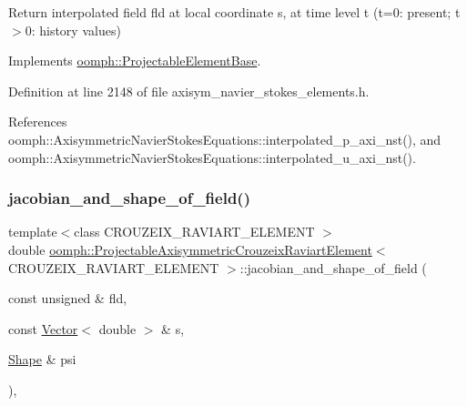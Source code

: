 Return interpolated field fld at local coordinate s, at time level t (t=0\+: present; t$>$0\+: history values) 



Implements \hyperlink{classoomph_1_1ProjectableElementBase_ae4da5b565b6d333be2f5920f7be763cd}{oomph\+::\+Projectable\+Element\+Base}.



Definition at line 2148 of file axisym\+\_\+navier\+\_\+stokes\+\_\+elements.\+h.



References oomph\+::\+Axisymmetric\+Navier\+Stokes\+Equations\+::interpolated\+\_\+p\+\_\+axi\+\_\+nst(), and oomph\+::\+Axisymmetric\+Navier\+Stokes\+Equations\+::interpolated\+\_\+u\+\_\+axi\+\_\+nst().

\mbox{\label{classoomph_1_1ProjectableAxisymmetricCrouzeixRaviartElement_ab2bb9d97b476c31f4f77f06f29b25883}} 
\subsubsection{\texorpdfstring{jacobian\+\_\+and\+\_\+shape\+\_\+of\+\_\+field()}{jacobian\_and\_shape\_of\_field()}}
{\footnotesize\ttfamily template$<$class C\+R\+O\+U\+Z\+E\+I\+X\+\_\+\+R\+A\+V\+I\+A\+R\+T\+\_\+\+E\+L\+E\+M\+E\+NT $>$ \\
double \hyperlink{classoomph_1_1ProjectableAxisymmetricCrouzeixRaviartElement}{oomph\+::\+Projectable\+Axisymmetric\+Crouzeix\+Raviart\+Element}$<$ C\+R\+O\+U\+Z\+E\+I\+X\+\_\+\+R\+A\+V\+I\+A\+R\+T\+\_\+\+E\+L\+E\+M\+E\+NT $>$\+::jacobian\+\_\+and\+\_\+shape\+\_\+of\+\_\+field (\begin{DoxyParamCaption}\item[{const unsigned \&}]{fld,  }\item[{const \hyperlink{classoomph_1_1Vector}{Vector}$<$ double $>$ \&}]{s,  }\item[{\hyperlink{classoomph_1_1Shape}{Shape} \&}]{psi }\end{DoxyParamCaption})\hspace{0.3cm}{\ttfamily [inline]}, {\ttfamily [virtual]}}



